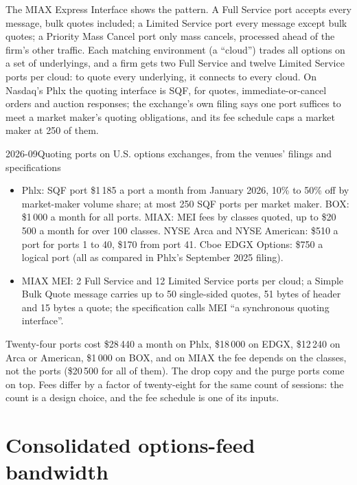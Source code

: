The MIAX Express Interface shows the pattern. A Full Service port accepts every message, bulk quotes included; a Limited
Service port every message except bulk quotes; a Priority Mass Cancel port only mass cancels, processed ahead of the
firm's other traffic. Each matching environment (a ``cloud'') trades all options on a set of underlyings, and a firm gets
two Full Service and twelve Limited Service ports per cloud: to quote every underlying, it connects to every cloud. On
Nasdaq's Phlx the quoting interface is SQF, for quotes, immediate-or-cancel orders and auction responses; the exchange's own
filing says one port suffices to meet a market maker's quoting obligations, and its fee schedule caps a market maker at 250
of them.

\begin{dated}{2026-09}{Quoting ports on U.S. options exchanges, from the venues' filings and specifications}\label{dat:nw:equities-and-options-connectivity:ports}
\begin{itemize}
\item Phlx: SQF port \$1\,185 a port a month from January 2026, 10\% to 50\% off by market-maker volume share; at most 250
  SQF ports per market maker. BOX: \$1\,000 a month for all ports. MIAX: MEI fees by classes quoted, up to \$20\,500 a month
  for over 100 classes. NYSE Arca and NYSE American: \$510 a port for ports 1 to 40, \$170 from port 41. Cboe EDGX Options:
  \$750 a logical port (all as compared in Phlx's September 2025 filing).
\item MIAX MEI: 2 Full Service and 12 Limited Service ports per cloud; a Simple Bulk Quote message carries up to 50
  single-sided quotes, 51 bytes of header and 15 bytes a quote; the specification calls MEI ``a synchronous quoting
  interface''.
\end{itemize}
\end{dated}

Twenty-four ports cost \$28\,440 a month on Phlx, \$18\,000 on EDGX, \$12\,240 on Arca or American, \$1\,000 on BOX, and on
MIAX the fee depends on the classes, not the ports (\$20\,500 for all of them). The drop copy and the purge ports come on
top. Fees differ by a factor of twenty-eight for the same count of sessions: the count is a design choice, and the fee
schedule is one of its inputs.

\section{Consolidated options-feed bandwidth}

